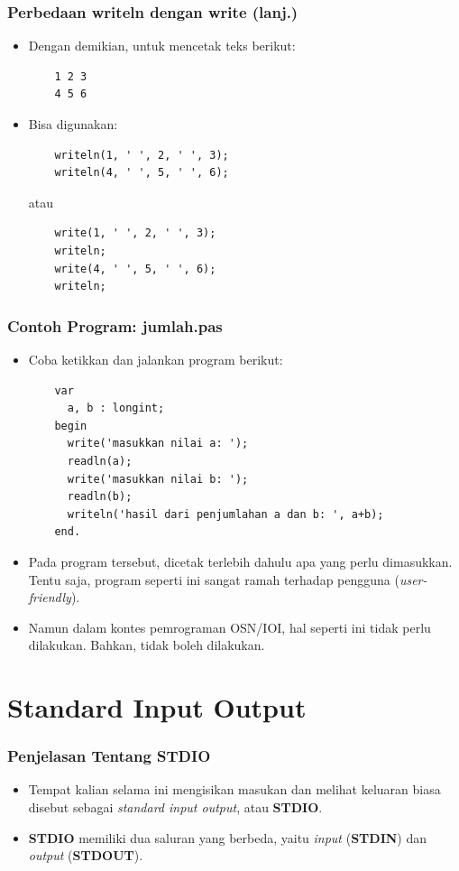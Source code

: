 \begin{frame}[fragile]
\frametitle{Perbedaan writeln dengan write (lanj.)}
\begin{itemize}
  \item Dengan demikian, untuk mencetak teks berikut:
  \begin{lstlisting}
    1 2 3
    4 5 6
  \end{lstlisting}
  \item Bisa digunakan:
  \begin{lstlisting}
    writeln(1, ' ', 2, ' ', 3);
    writeln(4, ' ', 5, ' ', 6);
  \end{lstlisting}
  atau
  \begin{lstlisting}
    write(1, ' ', 2, ' ', 3);
    writeln;
    write(4, ' ', 5, ' ', 6);
    writeln;
  \end{lstlisting}
\end{itemize}
\end{frame}

\begin{frame}[fragile]
\frametitle{Contoh Program: jumlah.pas}
\begin{itemize}
  \item Coba ketikkan dan jalankan program berikut:
  \begin{lstlisting}
    var
      a, b : longint;
    begin
      write('masukkan nilai a: ');
      readln(a);
      write('masukkan nilai b: ');
      readln(b);
      writeln('hasil dari penjumlahan a dan b: ', a+b);
    end.
  \end{lstlisting}
  \item Pada program tersebut, dicetak terlebih dahulu apa yang perlu dimasukkan. Tentu saja, program seperti ini sangat ramah terhadap pengguna (\textit{user-friendly}).
  \item Namun dalam kontes pemrograman OSN/IOI, hal seperti \newline ini tidak perlu dilakukan. Bahkan, tidak boleh dilakukan.
\end{itemize}
\end{frame}

\section{Standard Input Output}
\frame{\sectionpage}

\begin{frame}
\frametitle{Penjelasan Tentang STDIO}
\begin{itemize}
  \item Tempat kalian selama ini mengisikan masukan dan melihat keluaran biasa disebut sebagai \textit{standard input output}, atau \textbf{STDIO}.
  \item \textbf{STDIO} memiliki dua saluran yang berbeda, yaitu \textit{input} (\textbf{STDIN}) dan \textit{output} (\textbf{STDOUT}).
\end{itemize}
\end{frame}

